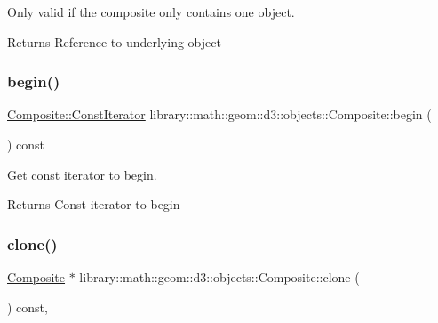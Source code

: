 Only valid if the composite only contains one object.

\begin{DoxyReturn}{Returns}
Reference to underlying object 
\end{DoxyReturn}
\mbox{\label{classlibrary_1_1math_1_1geom_1_1d3_1_1objects_1_1_composite_ad2225ca4b70ef899e6bdd7ff7296c1d8}} 
\subsubsection{\texorpdfstring{begin()}{begin()}}
{\footnotesize\ttfamily \hyperlink{classlibrary_1_1math_1_1geom_1_1d3_1_1objects_1_1_composite_a52745f3c676ff98e099683b978253fc5}{Composite\+::\+Const\+Iterator} library\+::math\+::geom\+::d3\+::objects\+::\+Composite\+::begin (\begin{DoxyParamCaption}{ }\end{DoxyParamCaption}) const}



Get const iterator to begin. 

\begin{DoxyReturn}{Returns}
Const iterator to begin 
\end{DoxyReturn}
\mbox{\label{classlibrary_1_1math_1_1geom_1_1d3_1_1objects_1_1_composite_a8d1d598683fe3149498b55a089217686}} 
\subsubsection{\texorpdfstring{clone()}{clone()}}
{\footnotesize\ttfamily \hyperlink{classlibrary_1_1math_1_1geom_1_1d3_1_1objects_1_1_composite}{Composite} $\ast$ library\+::math\+::geom\+::d3\+::objects\+::\+Composite\+::clone (\begin{DoxyParamCaption}{ }\end{DoxyParamCaption}) const\hspace{0.3cm}{\ttfamily [override]}, {\ttfamily [virtual]}}



